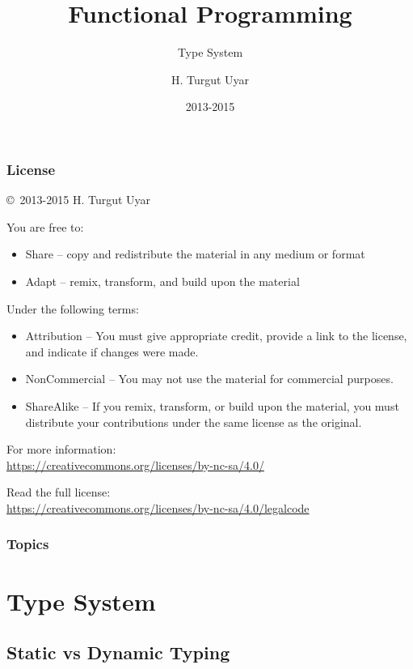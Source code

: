\documentclass[dvipsnames]{beamer}
\title{Functional Programming}
\subtitle{Type System}
\author{H. Turgut Uyar}
\date{2013-2015}
\theoremstyle{plain}
\begin{document}
\begin{frame}
  \titlepage
\end{frame}

\begin{frame}
  \frametitle{License}

  \hfill
  \copyright~2013-2015 H. Turgut Uyar

  \vfill
  \begin{footnotesize}
    You are free to:
    \begin{itemize}
      \itemsep0em
      \item Share -- copy and redistribute the material in any medium or format
      \item Adapt -- remix, transform, and build upon the material
    \end{itemize}

    Under the following terms:
    \begin{itemize}
      \itemsep0em
      \item Attribution -- You must give appropriate credit, provide a link to
        the license, and indicate if changes were made.

      \item NonCommercial -- You may not use the material for commercial
        purposes.

      \item ShareAlike -- If you remix, transform, or build upon the material,
        you must distribute your contributions under the same license as the
        original.
    \end{itemize}

    For more information:\\
    \url{https://creativecommons.org/licenses/by-nc-sa/4.0/}

    \smallskip
    Read the full license:\\
    \url{https://creativecommons.org/licenses/by-nc-sa/4.0/legalcode}
  \end{footnotesize}
\end{frame}

\begin{frame}
  \frametitle{Topics}
  \tableofcontents
\end{frame}

\section{Type System}

\subsection{Static vs Dynamic Typing}
\end{document}
